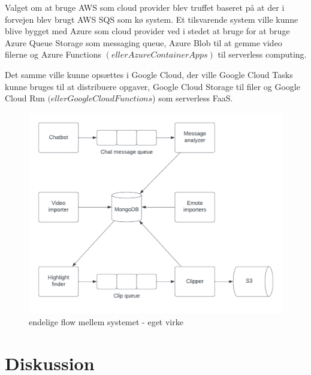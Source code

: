 \documentclass{article}
\begin{document}
Valget om at bruge AWS som cloud provider blev truffet baseret på at der i forvejen blev brugt AWS SQS som kø system. Et tilsvarende system ville kunne blive bygget med Azure som cloud provider ved i stedet at bruge for at bruge Azure Queue Storage som messaging queue, Azure Blob til at gemme video filerne og Azure Functions \((eller Azure Container Apps)\) til serverless computing.

Det samme ville kunne opsættes i Google Cloud, der ville Google Cloud Tasks kunne bruges til at distribuere opgaver, Google Cloud Storage til filer og Google Cloud Run \((eller Google Cloud Functions\)) som serverless FaaS.
\begin{figure}[!ht]
\centering
\includegraphics[width=\textwidth]{highlight-finder-overall-diagram.png}
\caption{endelige flow mellem systemet - eget virke}
\end{figure}


\section{Diskussion}
\end{document}
